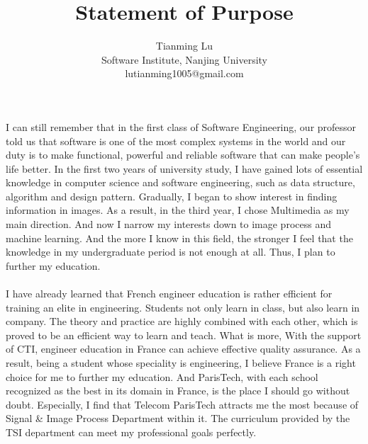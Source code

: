 \documentclass[a4paper]{article}
\title{Statement of Purpose}
\author{Tianming Lu \\
		Software Institute, Nanjing University\\
		lutianming1005@gmail.com}
\date{}
\begin{document}
\maketitle
\paragraph{}
I can still remember that in the first class of Software Engineering, our professor told us that software is one of the most complex systems in the world and our duty is to make functional, powerful and reliable software that can make people's life better. In the first two years of university study, I have gained lots of essential knowledge in computer science and software engineering, such as data structure, algorithm and design pattern. Gradually, I began to show interest in finding information in images. As a result, in the third year, I chose Multimedia as my main direction. And now I narrow my interests down to image process and machine learning.
And the more I know in this field, the stronger I feel that the knowledge in my undergraduate period is not enough at all. Thus, I plan to further my education. 
\paragraph{}
I have already learned that French engineer education is rather efficient for training an elite in engineering. Students not only learn in class, but also learn in company. The theory and practice are highly combined with each other, which is proved to be an efficient way to learn and teach. What is more, With the support of CTI, engineer education in France can achieve effective quality assurance. As a result, being a student whose speciality is engineering, I believe France is a right choice for me to further my education. And ParisTech, with each school recognized as the best in its domain in France, is the place I should go without doubt. Especially, I find that Telecom ParisTech attracts me the most because of Signal \& Image Process Department within it. The curriculum provided by the TSI department can meet my professional goals perfectly.
\end{document}
